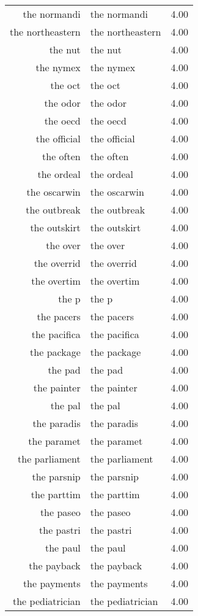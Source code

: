 \begin{table}[ht]
\begin{tabular}{rlr}
  the normandi & the normandi & 4.00 \\ 
  the northeastern & the northeastern & 4.00 \\ 
  the nut & the nut & 4.00 \\ 
  the nymex & the nymex & 4.00 \\ 
  the oct & the oct & 4.00 \\ 
  the odor & the odor & 4.00 \\ 
  the oecd & the oecd & 4.00 \\ 
  the official & the official & 4.00 \\ 
  the often & the often & 4.00 \\ 
  the ordeal & the ordeal & 4.00 \\ 
  the oscarwin & the oscarwin & 4.00 \\ 
  the outbreak & the outbreak & 4.00 \\ 
  the outskirt & the outskirt & 4.00 \\ 
  the over & the over & 4.00 \\ 
  the overrid & the overrid & 4.00 \\ 
  the overtim & the overtim & 4.00 \\ 
  the p & the p & 4.00 \\ 
  the pacers & the pacers & 4.00 \\ 
  the pacifica & the pacifica & 4.00 \\ 
  the package & the package & 4.00 \\ 
  the pad & the pad & 4.00 \\ 
  the painter & the painter & 4.00 \\ 
  the pal & the pal & 4.00 \\ 
  the paradis & the paradis & 4.00 \\ 
  the paramet & the paramet & 4.00 \\ 
  the parliament & the parliament & 4.00 \\ 
  the parsnip & the parsnip & 4.00 \\ 
  the parttim & the parttim & 4.00 \\ 
  the paseo & the paseo & 4.00 \\ 
  the pastri & the pastri & 4.00 \\ 
  the paul & the paul & 4.00 \\ 
  the payback & the payback & 4.00 \\ 
  the payments & the payments & 4.00 \\ 
  the pediatrician & the pediatrician & 4.00 \\ 

\end{tabular}
\end{table}
